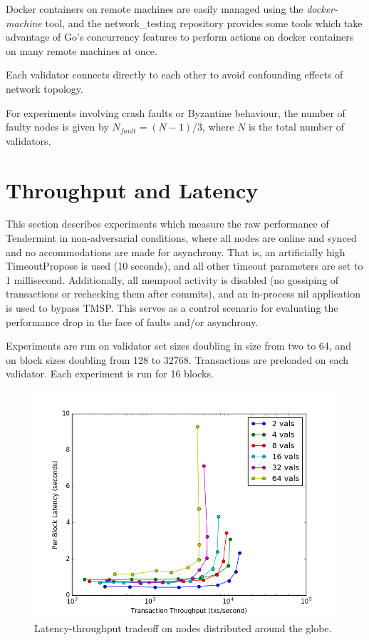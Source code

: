 Docker containers on remote machines are easily managed using the \emph{docker-machine} tool, 
and the network\_testing repository provides some tools which take advantage of Go's concurrency features
to perform actions on docker containers on many remote machines at once.

Each validator connects directly to each other to avoid confounding effects of network topology.

For experiments involving crash faults or Byzantine behaviour, the number of faulty nodes is given by $N_{fault} = (N-1)/3$,
where $N$ is the total number of validators.

\section{Throughput and Latency}

This section describes experiments which measure the raw performance of Tendermint in non-adversarial conditions,
where all nodes are online and synced and no accommodations are made for asynchrony.
That is, an artificially high TimeoutPropose is used (10 seconds), and all other timeout parameters are set to 1 millisecond.
Additionally, all mempool activity is disabled (no gossiping of transactions or rechecking them after commits),
and an in-process nil application is used to bypass TMSP.
This serves as a control scenario for evaluating the performance drop in the face of faults and/or asynchrony.

Experiments are run on validator set sizes doubling in size from two to 64, and on block sizes doubling from 128 to 32768.
Transactions are preloaded on each validator. Each experiment is run for 16 blocks. 


\begin{figure}[]
	\includegraphics[width=\linewidth,height=\textheight,keepaspectratio]{figures/throughput/latency-throughput.png}
    	\centering
	\caption[Latency-throughput in non-faulty network]{Latency-throughput tradeoff on nodes distributed around the globe.}
	\label{fig:exp_throughput_latency}
\end{figure}

